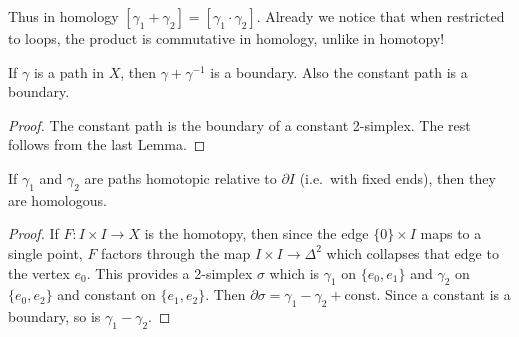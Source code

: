 \documentclass[english,letterpaper]{article}%
\numberwithin{equation}{section}
\numberwithin{figure}{section}
\numberwithin{table}{section}
\theoremstyle{definition}
\theoremstyle{definition}
\theoremstyle{definition}
\theoremstyle{plain}
\theoremstyle{plain}
\theoremstyle{plain}
\theoremstyle{plain}
\theoremstyle{remark}
\theoremstyle{remark}
\begin{document}
Thus in homology $[\gamma_1+\gamma_2]=[\gamma_1\cdot\gamma_2]$. Already we notice that when restricted to loops, the product is commutative in homology, unlike in homotopy!

\begin{lem}
    If $\gamma$ is a path in $X$, then $\gamma+\gamma^{-1}$ is a boundary. Also the constant path is a boundary.
\end{lem}
\begin{proof}
     The constant path is the boundary of a constant 2-simplex. The rest follows from the last Lemma.
\end{proof}

\begin{lem}
    If $\gamma_1$ and $\gamma_2$ are paths homotopic relative to $\partial I$ (i.e.\ with fixed ends), then they are homologous.
\end{lem}
\begin{proof}
     If $F:I\times I\to X$ is the homotopy, then since the edge $\{0\}\times I$ maps to a single point, $F$ factors through the map $I\times I\to \Delta^2$ which collapses that edge to the vertex $e_0$. This provides a 2-simplex $\sigma$ which is $\gamma_1$ on $\{e_0,e_1\}$ and $\gamma_2$ on $\{e_0,e_2\}$ and constant on $\{e_1,e_2\}$. Then $\partial\sigma=\gamma_1-\gamma_2+\text{const}$. Since a constant is a boundary, so is $\gamma_1-\gamma_2$.
\end{proof}
\end{document}
